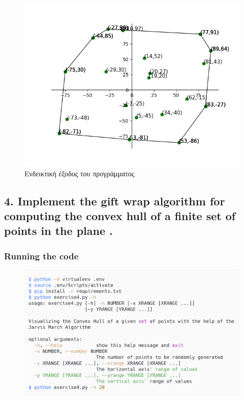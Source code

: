 \documentclass[12pt]{article}
\newenvironment{matlab}
	{\begin{figure}[hp]\centering\captionsetup{justification=centering}}
	{\end{figure}}
\begin{document}
\begin{matlab}
	\includegraphics[scale=0.7]{images/exercise3_1.png}
	\caption{Ενδεικτική έξοδος του προγράμματος}
\end{matlab}

\vspace{2in}

\pagebreak

\subsection*{4. Implement the gift wrap algorithm for computing the convex hull of a finite
    set of points in the plane .}

\vspace{2in}

\subsubsection*{Running the code}

\begin{matlab}
    \includegraphics[scale=0.140]{images/exercise4.png}
\end{matlab}

\pagebreak
\end{document}
